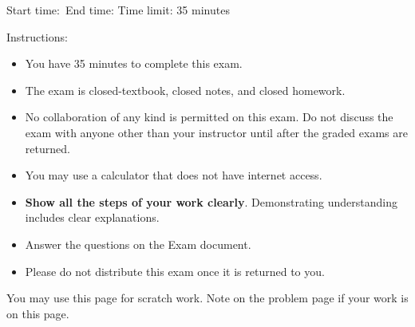 \documentclass{exam}
\begin{document}
\setcounter{page}{0}
\thispagestyle{empty}

{\Large \hrulefill}%

{Start time:\hrulefill\ End time: \hrulefill}
Time limit: 35 minutes

\vspace{1cm}
{\Large Instructions:}
\begin{itemize}

 \item You have 35 minutes to complete this exam.

 \item The exam is closed-textbook, closed notes, and closed homework. 
 
 \item No collaboration of any kind is permitted on this exam. Do not discuss the exam with anyone other than your instructor until after the graded exams are returned.
 
 \item You may use a calculator that does not have internet access. 

 \item \textbf{Show all the steps of your work clearly}. Demonstrating understanding includes clear explanations.
 
\item Answer the questions on the Exam document. 


\item Please do not distribute this exam once it is returned to you.



 \end{itemize}


\afterpage{\blankpage}

\clearpage


 \begin{questions}


 \question 

 \question 

 \question 
 
 
\end{questions}

You may use this page for scratch work. Note on the problem page if your work is on this page.
\thispagestyle{empty}
\hbox{}


\checkoddpage{}
\end{document}
